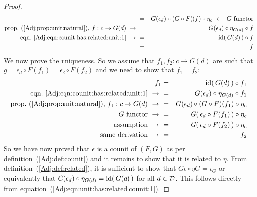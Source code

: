 \begin{proof}
\begin{eqnarray*}
            &=&G(\epsilon_{d})\circ(G\circ F)(f)\circ\eta_{c}
            \ \leftarrow\ \mbox{$G$ functor}\\
            \mbox{prop.~(\ref{Adj:prop:unit:natural}), $f:c\to G(d)$}\ \to\ 
            &=&G(\epsilon_{d})\circ\eta_{G(d)}\circ f\\
            \mbox{eqn.~\ref{Adj:eqn:counit:has:related:unit:1}}\ \to\ 
            &=&\id(\,G(d)\,)\circ f\\
            &=&f
        \end{eqnarray*}
    We now prove the uniqueness. So we assume that $f_{1},f_{2}:c\to G(d)$ are
    such that $g=\epsilon_{d}\circ F(f_{1})=\epsilon_{d}\circ F(f_{2})$ and
    we need to show that $f_{1}=f_{2}$:
        \begin{eqnarray*}f_{1}
            &=&\id(\,G(d)\,)\circ f_{1}\\
            \mbox{eqn.~\ref{Adj:eqn:counit:has:related:unit:1}}\ \to\ 
            &=&G(\epsilon_{d})\circ\eta_{G(d)}\circ f_{1}\\
            \mbox{prop.~(\ref{Adj:prop:unit:natural}), $f_{1}:c\to G(d)$}\ \to\ 
            &=&G(\epsilon_{d})\circ (G\circ F)(f_{1})\circ\eta_{c}\\
            \mbox{$G$ functor}\ \to\ 
            &=&G(\,\epsilon_{d}\circ F(f_{1})\,)\circ\eta_{c}\\
            \mbox{assumption}\ \to\ 
            &=&G(\,\epsilon_{d}\circ F(f_{2})\,)\circ\eta_{c}\\
            \mbox{same derivation}\ \to\ 
            &=&f_{2}
        \end{eqnarray*}
    So we have now proved that $\epsilon$ is a counit of $(F,G)$ as per
    definition~(\ref{Adj:def:counit}) and it remains to show that it is
    related to $\eta$. From definition~(\ref{Adj:def:related}), 
    it is sufficient to show that $G\epsilon\circ\eta G=\iota_{G}$ or
    equivalently that $G(\epsilon_{d})\circ\eta_{G(d)}=\mbox{\rm id}(\,G(d)\,)$ for
    all $d\in\mbox{$\cal D$}$. This follows directly from 
    equation~(\ref{Adj:eqn:unit:has:related:counit:1}).
\end{proof}


